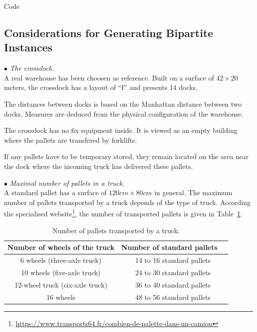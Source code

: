 \documentclass[preprint,12pt,authoryear]{elsarticle}
\begin{document}
Code

\newpage

%
%
\subsection{Considerations for Generating Bipartite Instances}
\label{app:ConsiderationsInstancesBipartite}

\bigskip
\noindent
$\bullet$ \textit{The crossdock.}\\
%
A real warehouse has been choosen as reference. 
Built on a surface of $42 \times 20$ meters, the crossdock has a layout of ``I'' and presents 14 docks.


The distances between docks is based on the Manhattan distance between two docks. Measures are deduced from the physical configuration of the warehouse.

The crossdock has no fix equipment inside. It is viewed as an empty building where the pallets are transfered by forklifts.

If any pallets have to be temporary stored, they remain located on the area near the dock where the incoming truck has delivered these pallets.


\bigskip
\noindent
$\bullet$ \textit{Maximal number of pallets in a truck.}\\
%
A standard pallet has a surface of $120 cm \times 80 cm$ in general.
%
The maximum number of pallets transported by a truck depends of the type of truck. According the specialised website\footnote{\url{https://www.transports64.fr/combien-de-palette-dans-un-camion}}, the number of transported pallets is given in Table~\ref{tab:nbPalettes}.


\begin{table}[h!]
\begin{center}
\begin{tabular}{|c|c|}
\hline
\quad Number of wheels of the truck \quad & \quad Number of standard pallets $\mbox{  }$\quad \\
\hline
6 wheels (three-axle truck) & 14 to 16 standard pallets \\
10 wheels (five-axle truck) & 24 to 30 standard pallets \\
12-wheel truck (six-axle truck)& 36 to 40 standard pallets \\
16 wheels & 48 to 56 standard pallets\\
\hline
\end{tabular}
\caption{Number of pallets transported by a truck.}
\label{tab:nbPalettes}
\end{center}
\end{table}%
\end{document}
